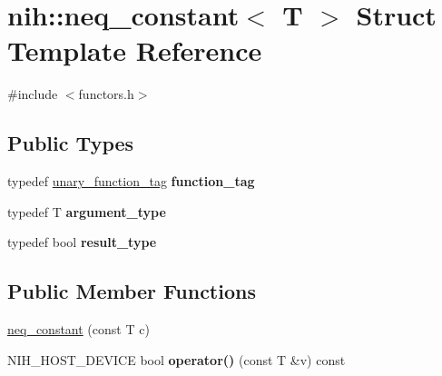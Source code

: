 \hypertarget{structnih_1_1neq__constant}{
\section{nih\-:\-:neq\-\_\-constant$<$ \-T $>$ \-Struct \-Template \-Reference}
\label{structnih_1_1neq__constant}
}


{\ttfamily \#include $<$functors.\-h$>$}

\subsection*{\-Public \-Types}
\begin{DoxyCompactItemize}
\item 
\hypertarget{structnih_1_1neq__constant_acedf9b8ac86a2f40182a1c0bacce7484}{
typedef \hyperlink{structnih_1_1unary__function__tag}{unary\-\_\-function\-\_\-tag} {\bfseries function\-\_\-tag}}
\label{structnih_1_1neq__constant_acedf9b8ac86a2f40182a1c0bacce7484}

\item 
\hypertarget{structnih_1_1neq__constant_a5371f7ee6d1529d313270fd646374503}{
typedef \-T {\bfseries argument\-\_\-type}}
\label{structnih_1_1neq__constant_a5371f7ee6d1529d313270fd646374503}

\item 
\hypertarget{structnih_1_1neq__constant_ade3a0d53d89c4cd7489dcb5cd2d0c9ad}{
typedef bool {\bfseries result\-\_\-type}}
\label{structnih_1_1neq__constant_ade3a0d53d89c4cd7489dcb5cd2d0c9ad}

\end{DoxyCompactItemize}
\subsection*{\-Public \-Member \-Functions}
\begin{DoxyCompactItemize}
\item 
\hyperlink{structnih_1_1neq__constant_aa3c9bf5428af842bf0f1619bd949e185}{neq\-\_\-constant} (const \-T c)
\item 
\hypertarget{structnih_1_1neq__constant_a9f3c46391c1d564727c0c9261f908ae4}{
\-N\-I\-H\-\_\-\-H\-O\-S\-T\-\_\-\-D\-E\-V\-I\-C\-E bool {\bfseries operator()} (const \-T \&v) const }
\label{structnih_1_1neq__constant_a9f3c46391c1d564727c0c9261f908ae4}

\end{DoxyCompactItemize}


